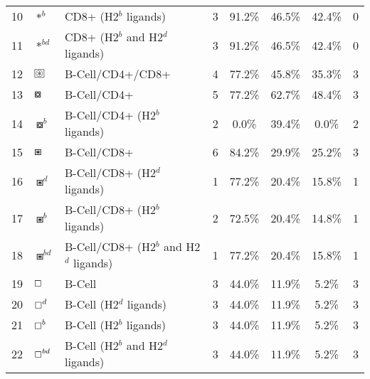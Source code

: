 \begin{tabular}{rllccccc}
10 &                                           $ \ast^b $ &                    CD8+ (H2$^b$ ligands) &            3 &         91.2\% &          46.5\% &         42.4\% &                          0 \\
11 &                                        $ \ast^{bd} $ &         CD8+ (H2$^b$ and H2$^d$ ligands) &            3 &         91.2\% &          46.5\% &         42.4\% &                          0 \\
12 &  $ \setlength{\fboxsep}{0.5pt} \boxed{\circledast} $ &                         B-Cell/CD4+/CD8+ &            4 &         77.2\% &          45.8\% &         35.3\% &                          3 \\
13 &                                       $ \boxcircle $ &                              B-Cell/CD4+ &            5 &         77.2\% &          62.7\% &         48.4\% &                          3 \\
14 &                                     $ \boxcircle^b $ &             B-Cell/CD4+ (H2$^b$ ligands) &            2 &          0.0\% &          39.4\% &          0.0\% &                          2 \\
15 &                                          $ \boxast $ &                              B-Cell/CD8+ &            6 &         84.2\% &          29.9\% &         25.2\% &                          3 \\
16 &                                        $ \boxast^d $ &             B-Cell/CD8+ (H2$^d$ ligands) &            1 &         77.2\% &          20.4\% &         15.8\% &                          1 \\
17 &                                        $ \boxast^b $ &             B-Cell/CD8+ (H2$^b$ ligands) &            2 &         72.5\% &          20.4\% &         14.8\% &                          1 \\
18 &                                     $ \boxast^{bd} $ &  B-Cell/CD8+ (H2$^b$ and H2$^d$ ligands) &            1 &         77.2\% &          20.4\% &         15.8\% &                          1 \\
19 &                                        $ \boxempty $ &                                   B-Cell &            3 &         44.0\% &          11.9\% &          5.2\% &                          3 \\
20 &                                      $ \boxempty^d $ &                  B-Cell (H2$^d$ ligands) &            3 &         44.0\% &          11.9\% &          5.2\% &                          3 \\
21 &                                      $ \boxempty^b $ &                  B-Cell (H2$^b$ ligands) &            3 &         44.0\% &          11.9\% &          5.2\% &                          3 \\
22 &                                   $ \boxempty^{bd} $ &       B-Cell (H2$^b$ and H2$^d$ ligands) &            3 &         44.0\% &          11.9\% &          5.2\% &                          3 \\
\bottomrule
\end{tabular}
